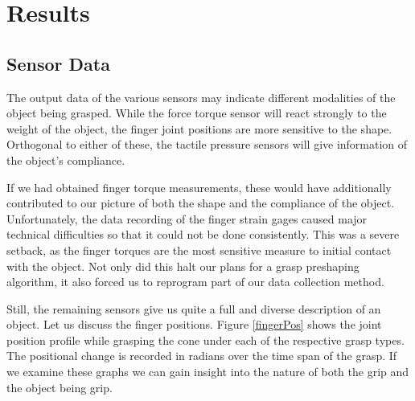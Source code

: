 \renewcommand{\thesection}{\Roman{section}}
\section{Results}
\subsection*{Sensor Data}
The output data of the various sensors may indicate different modalities of the object being grasped. While the force torque sensor will react strongly to the weight of the object, the finger joint positions are more sensitive to the shape. Orthogonal to either of these, the tactile pressure sensors will give information of the object's compliance.

If we had obtained finger torque measurements, these would have additionally contributed to our picture of both the shape and the compliance of the object. Unfortunately, the data recording of the finger strain gages caused major technical difficulties so that it could not be done consistently. This was a severe setback, as the finger torques are the most sensitive measure to initial contact with the object. Not only did this halt our plans for a grasp preshaping algorithm, it also forced us to reprogram part of our data collection method.

Still, the remaining sensors give us quite a full and diverse description of an object. Let us discuss the finger positions. Figure \ref{fingerPos} shows the joint position profile while grasping the cone under each of the respective grasp types. The positional change is recorded in radians over the time span of the grasp. If we examine these graphs we can gain insight into the nature of both the grip and the object being grip.

